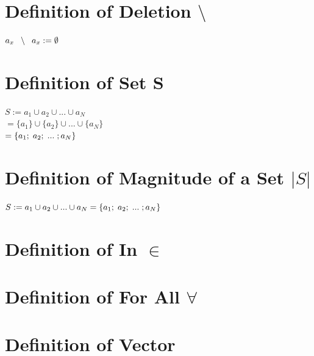 \documentclass[11pt]{article}
\begin{document}
\section{Definition of Deletion $\setminus$}
\begin{center}
$
a_x \hspace{2mm}\setminus \hspace{2mm} a_x := \emptyset
$
\end{center}





\section{Definition of Set S}
\begin{center}
$
S := a_1 \cup a_2 \cup ... \cup a_N
$
\\ \vspace{2mm}
$
= \{a_1\} \cup \{a_2\} \cup ... \cup \{a_N\}
$
\\ \vspace{2mm}
$
= \{a_1; \hspace{1mm} a_2; \hspace{1mm} ... \hspace{1mm}; a_N\}
$
\end{center}






\section{Definition of Magnitude of a Set $|S|$}
\begin{center}
$
S := a_1 \cup a_2 \cup ... \cup a_N = \{a_1; \hspace{1mm} a_2; \hspace{1mm} ... \hspace{1mm}; a_N\}
$
\end{center}



\section{Definition of In $\in$}
\section{Definition of For All $\forall$}




\section{Definition of Vector}
\end{document}
